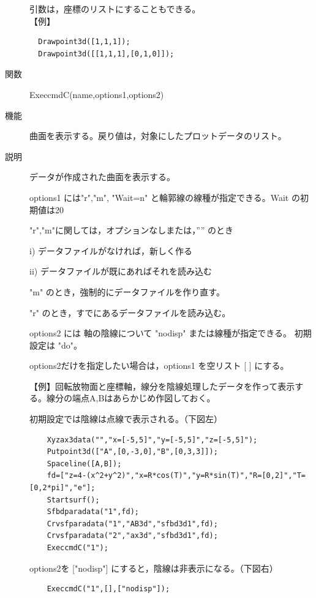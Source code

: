 \documentclass[papersize,a4paper,12pt,uplatex]{jsarticle}
\begin{document}
\begin{description}
引数は，座標のリストにすることもできる。\\
\vspace{\baselineskip}
【例】
\begin{verbatim}
  Drawpoint3d([1,1,1]);
  Drawpoint3d([[1,1,1],[0,1,0]]);
\end{verbatim}
\vspace{\baselineskip}

\hypertarget{execcmdc}{}
\item[関数]  ExeccmdC(name,options1,options2)
\item[機能]  曲面を表示する。戻り値は，対象にしたプロットデータのリスト。
\item[説明]  データが作成された曲面を表示する。

options1 には"r","m", "Wait=n" と輪郭線の線種が指定できる。Wait の初期値は20

  "r","m"に関しては，オプションなしまたは，”” のとき
  
    i) データファイルがなければ，新しく作る
    
    ii) データファイルが既にあればそれを読み込む
    
  "m"  のとき，強制的にデータファイルを作り直す。
  
  "r" のとき，すでにあるデータファイルを読み込む。
  
options2 には 軸の陰線について "nodisp" または線種が指定できる。 初期設定は "do"。

options2だけを指定したい場合は，options1 を空リスト [ ] にする。


\vspace{\baselineskip}
【例】回転放物面と座標軸，線分を陰線処理したデータを作って表示する。線分の端点A,Bはあらかじめ作図しておく。

 初期設定では陰線は点線で表示される。（下図左）
\begin{verbatim}
    Xyzax3data("","x=[-5,5]","y=[-5,5]","z=[-5,5]");
    Putpoint3d(["A",[0,-3,0],"B",[0,3,3]]);
    Spaceline([A,B]);
    fd=["z=4-(x^2+y^2)","x=R*cos(T)","y=R*sin(T)","R=[0,2]","T=[0,2*pi]","e"];
    Startsurf();
    Sfbdparadata("1",fd);
    Crvsfparadata("1","AB3d","sfbd3d1",fd);
    Crvsfparadata("2","ax3d","sfbd3d1",fd);
    ExeccmdC("1");
\end{verbatim}
options2を ["nodisp"] にすると，陰線は非表示になる。（下図右）
\begin{verbatim}
    ExeccmdC("1",[],["nodisp"]);
\end{verbatim}

        \begin{center}       \end{center}


\end{description}
\end{document}
